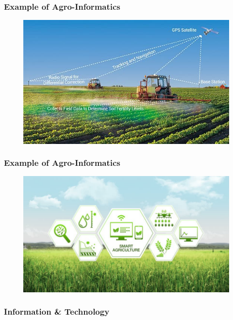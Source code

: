 \documentclass[
	11pt, %
]{beamer}
\begin{document}
\begin{frame}
	\frametitle{Example of Agro-Informatics}
	\begin{figure}
		\includegraphics[width=0.8\linewidth]{images/figure2.png}
		\label{fig:https://www.vervetronics.com/solutions/iot-smart-agriculture/precision-agriculture/}
	\end{figure}
\end{frame}

\begin{frame}
	\frametitle{Example of Agro-Informatics}
	\begin{figure}
		\includegraphics[width=0.8\linewidth]{images/figure3.jpg}
		\label{fig:https://www.linkedin.com/pulse/smart-farming-data-science-sanket-dayama}
	\end{figure}
\end{frame}

\begin{frame}
	\frametitle{Information & Technology}


\end{frame}
\end{document}
